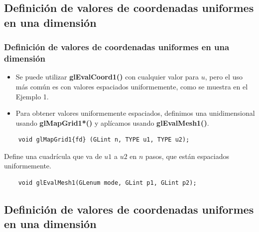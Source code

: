 \documentclass[10.5pt]{beamer}
\begin{document}
\subsection{Definición de valores de coordenadas uniformes en una dimensión}

\begin{frame}[fragile]
 \frametitle{Definición de valores de coordenadas uniformes en una dimensión}

\begin{itemize}
\justifying
    \item Se puede utilizar \textbf{glEvalCoord1()} con cualquier valor para $u$, pero el uso más común es con valores espaciados uniformemente, como se muestra en el Ejemplo 1.

    \item Para obtener valores uniformemente espaciados, definimos una unidimensional usando \textbf{glMapGrid1*()} y aplícamos usando \textbf{glEvalMesh1()}.
\end{itemize}

\begin{alertblock}{}
\small
\begin{verbatim}
    void glMapGrid1{fd} (GLint n, TYPE u1, TYPE u2);
\end{verbatim}
\end{alertblock}
Define una cuadrícula que va de $u1$ a $u2$ en $n$ pasos, que están espaciados uniformemente.
\begin{alertblock}{}
\small
\begin{verbatim}
    void glEvalMesh1(GLenum mode, GLint p1, GLint p2);
\end{verbatim}
\end{alertblock}
\end{frame}

\subsection{Definición de valores de coordenadas uniformes en una dimensión}
\end{document}

